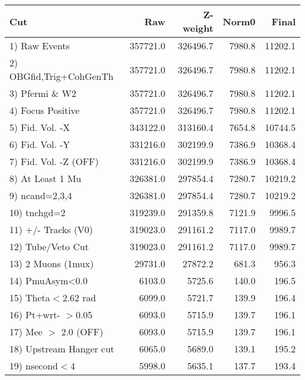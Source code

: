 \begin{table}[h!]\centering
 \begin{tabular}{||l||r|r|r|r||}
 \hline
 \hline
 Cut & Raw & Z-weight & Norm0 & Final \\
 \hline
  1) Raw Events           &    357721.0 &    326496.7 &      7980.8 &     11202.1 \\
  2) OBGfid,Trig+CohGenTh &    357721.0 &    326496.7 &      7980.8 &     11202.1 \\
  3) Pfermi \& W2         &    357721.0 &    326496.7 &      7980.8 &     11202.1 \\
  4) Focus Positive       &    357721.0 &    326496.7 &      7980.8 &     11202.1 \\
  5) Fid. Vol. -X         &    343122.0 &    313160.4 &      7654.8 &     10744.5 \\
  6) Fid. Vol. -Y         &    331216.0 &    302199.9 &      7386.9 &     10368.4 \\
  7) Fid. Vol. -Z (OFF)   &    331216.0 &    302199.9 &      7386.9 &     10368.4 \\
  8) At Least 1 Mu        &    326381.0 &    297854.4 &      7280.7 &     10219.2 \\
  9) ncand=2,3,4          &    326381.0 &    297854.4 &      7280.7 &     10219.2 \\
 10) tnchgd=2             &    319239.0 &    291359.8 &      7121.9 &      9996.5 \\
 11) +/- Tracks (V0)      &    319023.0 &    291161.2 &      7117.0 &      9989.7 \\
 12) Tube/Veto Cut        &    319023.0 &    291161.2 &      7117.0 &      9989.7 \\
 13) 2 Muons (1mux)       &     29731.0 &     27872.2 &       681.3 &       956.3 \\
 14) PmuAsym<0.0          &      6103.0 &      5725.6 &       140.0 &       196.5 \\
 15) Theta$<$2.62 rad     &      6099.0 &      5721.7 &       139.9 &       196.4 \\
 16) Pt+wrt- $>$0.05      &      6093.0 &      5715.9 &       139.7 &       196.1 \\
 17) Mee $>$ 2.0  (OFF)   &      6093.0 &      5715.9 &       139.7 &       196.1 \\
 18) Upstream Hanger cut  &      6065.0 &      5689.0 &       139.1 &       195.2 \\
 19) nsecond$<$4          &      5998.0 &      5635.1 &       137.7 &       193.4 \\

\end{tabular}
\end{table}

